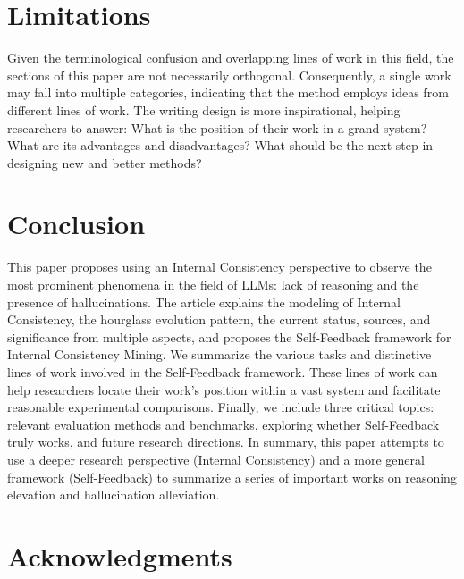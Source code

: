 \documentclass[lettersize,journal]{IEEEtran}
\begin{document}


\section{Limitations}


\noindent Given the terminological confusion and overlapping lines of work in this field, the sections of this paper are not necessarily orthogonal. Consequently, a single work may fall into multiple categories, indicating that the method employs ideas from different lines of work. The writing design is more inspirational, helping researchers to answer: What is the position of their work in a grand system? What are its advantages and disadvantages? What should be the next step in designing new and better methods?


\section{Conclusion}


\noindent This paper proposes using an Internal Consistency perspective to observe the most prominent phenomena in the field of LLMs: lack of reasoning and the presence of hallucinations. The article explains the modeling of Internal Consistency, the hourglass evolution pattern, the current status, sources, and significance from multiple aspects, and proposes the Self-Feedback framework for Internal Consistency Mining. We summarize the various tasks and distinctive lines of work involved in the Self-Feedback framework. These lines of work can help researchers locate their work's position within a vast system and facilitate reasonable experimental comparisons. Finally, we include three critical topics: relevant evaluation methods and benchmarks, exploring whether Self-Feedback truly works, and future research directions. In summary, this paper attempts to use a deeper research perspective (Internal Consistency) and a more general framework (Self-Feedback) to summarize a series of important works on reasoning elevation and hallucination alleviation.


\section*{Acknowledgments}
\end{document}
